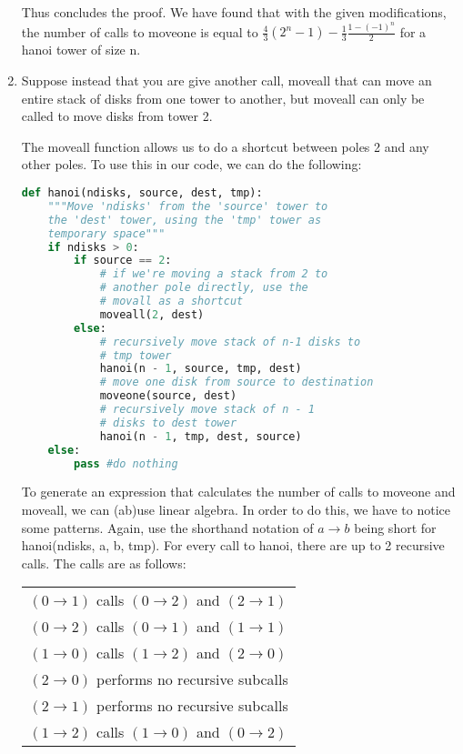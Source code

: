 \documentclass[11pt, letterpaper]{article}
\begin{document}
\begin{enumerate}[label=(\alph*)]

\quad Thus concludes the proof. We have found that with the given modifications, the number of calls to moveone is equal to $\frac{4}{3}(2^n - 1)- \frac{1}{3}\frac{1 - (-1)^n}{2}$ for a hanoi tower of size n.

\bigbreak

\pagebreak

\item Suppose instead that you are give another call, moveall that can move an entire stack of disks from one tower to another, but moveall can only be called to move disks from tower 2.

\quad The moveall function allows us to do a shortcut between poles 2  and any other poles. To use this in our code, we can do the following:

\begin{center}
\begin{lstlisting}[language=python]
def hanoi(ndisks, source, dest, tmp):
	"""Move 'ndisks' from the 'source' tower to 
	the 'dest' tower, using the 'tmp' tower as 
	temporary space"""		
	if ndisks > 0:
		if source == 2:
			# if we're moving a stack from 2 to
			# another pole directly, use the 
			# movall as a shortcut
			moveall(2, dest)
		else:
			# recursively move stack of n-1 disks to
			# tmp tower
			hanoi(n - 1, source, tmp, dest)
			# move one disk from source to destination
			moveone(source, dest)
			# recursively move stack of n - 1
			# disks to dest tower
			hanoi(n - 1, tmp, dest, source)
	else:
		pass #do nothing
\end{lstlisting}
\end{center}

\quad To generate an expression that calculates the number of calls to moveone and moveall, we can (ab)use linear algebra. In order to do this, we have to notice some patterns. Again, use the shorthand notation of $a \rightarrow b$ being short for hanoi(ndisks, a, b, tmp). For every call to hanoi, there are up to 2 recursive calls. The calls are as follows:

\begin{center}
\begin{tabular}{l}
$(0 \rightarrow 1)$ calls $(0 \rightarrow 2)$ and $(2 \rightarrow 1)$ \\
$(0 \rightarrow 2)$ calls $(0 \rightarrow 1)$ and $(1 \rightarrow 1)$ \\
$(1 \rightarrow 0)$ calls $(1 \rightarrow 2)$ and $(2 \rightarrow 0)$ \\
$(2 \rightarrow 0)$ performs no recursive subcalls \\
$(2 \rightarrow 1)$ performs no recursive subcalls \\
$(1 \rightarrow 2)$ calls $(1 \rightarrow 0)$ and $(0 \rightarrow 2)$ \\
\end{tabular}
\end{center}


\end{enumerate}
\end{document}
